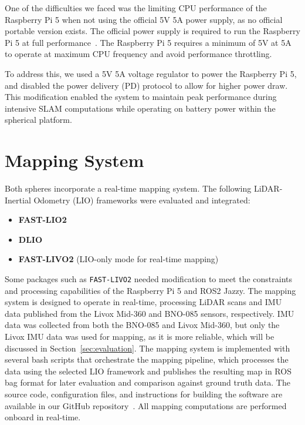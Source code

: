 \documentclass[english, bachelor, utf8]{base/thesis_telematics}
\begin{document}
One of the difficulties we faced was the limiting CPU performance of the Raspberry Pi 5 when not using the official 5V 5A power supply, as no official portable version exists. 
The official power supply is required to run the Raspberry Pi 5 at full performance~\cite{raspberrypi_psu}.
The Raspberry Pi 5 requires a minimum of 5V at 5A to operate at maximum CPU frequency and avoid performance throttling.

To address this, we used a 5V 5A voltage regulator to power the Raspberry Pi 5, and disabled the power delivery (PD) protocol to allow for higher power draw.
This modification enabled the system to maintain peak performance during intensive SLAM computations while operating on battery power within the spherical platform.


\section{Mapping System}
Both spheres incorporate a real-time mapping system. 
The following LiDAR-Inertial Odometry (LIO) frameworks were evaluated and integrated:
\begin{itemize}
    \item \textbf{FAST-LIO2}
    \item \textbf{DLIO}
    \item \textbf{FAST-LIVO2} (LIO-only mode for real-time mapping)
\end{itemize}

Some packages such as \texttt{FAST-LIVO2} needed modification to meet the constraints and processing capabilities of the Raspberry Pi 5 and ROS2 Jazzy.
The mapping system is designed to operate in real-time, processing LiDAR scans and IMU data published from the Livox Mid-360 and BNO-085 sensors, respectively.
IMU data was collected from both the BNO-085 and Livox Mid-360, but only the Livox IMU data was used for mapping, as it is more reliable, which will be discussed in Section~\ref{sec:evaluation}.
The mapping system is implemented with several bash scripts that orchestrate the mapping pipeline, which processes the data using the selected LIO framework and publishes the resulting map in ROS bag format for later evaluation and comparison against ground truth data.
The source code, configuration files, and instructions for building the software are available in our GitHub repository~\cite{githubsphere}.
All mapping computations are performed onboard in real-time.
\end{document}
